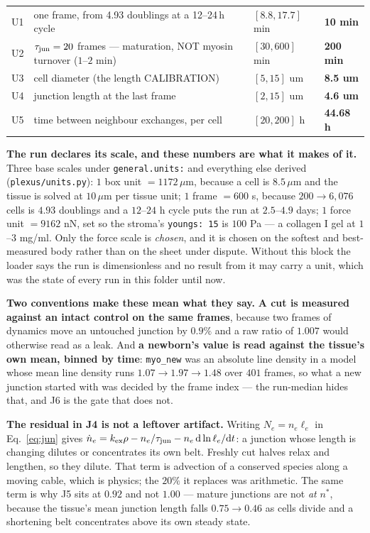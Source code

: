 \documentclass[10pt,a4paper]{article}
\newcommand{\pass}[1]{\textcolor{gpass}{\textbf{#1}}}
\newcommand{\code}[1]{\texttt{#1}}
\begin{document}
{\begin{tabularx}{\textwidth}{@{}llLl@{}}
U1& one frame, from 4.93 doublings at a 12--24\,h cycle & $[8.8, 17.7]$ min & \pass{10 min}\\
U2& $\tau_{\rm jun}=20$ frames --- maturation, NOT myosin turnover ($1$--$2$ min) & $[30, 600]$ min & \pass{200 min}\\
U3& cell diameter (the length CALIBRATION) & $[5, 15]$ um & \pass{8.5 um}\\
U4& junction length at the last frame & $[2, 15]$ um & \pass{4.6 um}\\
U5& time between neighbour exchanges, per cell & $[20, 200]$ h & \pass{44.68 h}\\
\bottomrule\end{tabularx}}
\smallskip


\textbf{The run declares its scale, and these numbers are what it makes of it.} Three base scales
under \code{general.units:} and everything else derived (\code{plexus/units.py}): $1$ box unit
$=1172\,\mu$m, because a cell is $8.5\,\mu$m and the tissue is solved at $10\,\mu$m per tissue
unit; $1$ frame $=600$ s, because $200\to6{,}076$ cells is $4.93$ doublings and a $12$--$24$ h
cycle puts the run at $2.5$--$4.9$ days; $1$ force unit $=9162$ nN, set so the stroma's
\code{youngs: 15} is $100$ Pa --- a collagen I gel at $1$--$3$ mg/ml. Only the force scale is
\emph{chosen}, and it is chosen on the softest and best-measured body rather than on the sheet under
dispute. Without this block the loader says the run is dimensionless and no result from it may carry
a unit, which was the state of every run in this folder until now.

\textbf{Two conventions make these mean what they say.} \textbf{A cut is measured against an intact
control on the same frames}, because two frames of dynamics move an untouched junction by $0.9\%$ and
a raw ratio of $1.007$ would otherwise read as a leak. And \textbf{a newborn's value is read against
the tissue's own mean, binned by time}: \code{myo\_new} was an absolute line density in a model whose
mean line density runs $1.07\to1.97\to1.48$ over $401$ frames, so what a new junction started with was
decided by the frame index --- the run-median hides that, and J6 is the gate that does not.

\textbf{The residual in J4 is not a leftover artifact.} Writing $N_e=n_e\ell_e$ in Eq.~\eqref{eq:jun}
gives $\dot n_e=k_{\rm ex}\rho-n_e/\tau_{\rm jun}-n_e\,\mathrm d\ln\ell_e/\mathrm dt$: a junction whose
length is changing dilutes or concentrates its own belt. Freshly cut halves relax and lengthen, so they
dilute. That term is advection of a conserved species along a moving cable, which is physics; the
$20\%$ it replaces was arithmetic. The same term is why J5 sits at $0.92$ and not $1.00$ --- mature
junctions are not \emph{at} $n^\ast$, because the tissue's mean junction length falls $0.75\to0.46$ as
cells divide and a shortening belt concentrates above its own steady state.
\end{document}

